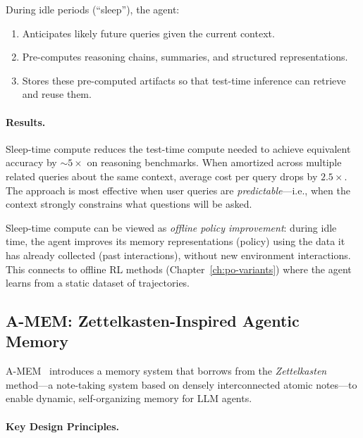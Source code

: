 During idle periods (``sleep''), the agent:

\begin{enumerate}
  \item Anticipates likely future queries given the current context.
  \item Pre-computes reasoning chains, summaries, and structured representations.
  \item Stores these pre-computed artifacts so that test-time inference can retrieve and reuse them.
\end{enumerate}

\paragraph{Results.}
\label{results.}

Sleep-time compute reduces the test-time compute needed to achieve equivalent accuracy by $\sim$$5\times$ on reasoning benchmarks. When amortized across multiple related queries about the same context, average cost per query drops by $2.5\times$. The approach is most effective when user queries are \emph{predictable}---i.e., when the context strongly constrains what questions will be asked.

\begin{intuitionbox}
Sleep-time compute can be viewed as \emph{offline policy improvement}: during idle time, the agent improves its memory representations (policy) using the data it has already collected (past interactions), without new environment interactions. This connects to offline RL methods (Chapter~\ref{ch:po-variants}) where the agent learns from a static dataset of trajectories.
\end{intuitionbox}

\subsection{A-MEM: Zettelkasten-Inspired Agentic Memory}
\label{a-mem-zettelkasten-inspired-agentic-memory}

A-MEM~\cite{xu2025amem} introduces a memory system that borrows from the \emph{Zettelkasten} method---a note-taking system based on densely interconnected atomic notes---to enable dynamic, self-organizing memory for LLM agents.

\paragraph{Key Design Principles.}
\label{key-design-principles.}

